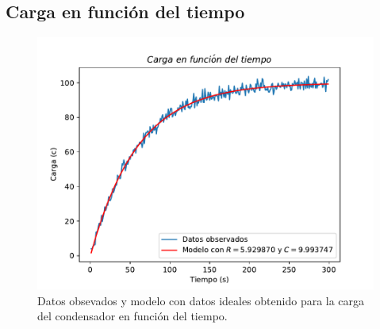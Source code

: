 \documentclass[12pt,letterpaper]{article}
\begin{document}
\subsection{Carga en función del tiempo}
\begin{figure}[H]
\includegraphics{carga.pdf}
\caption{Datos obsevados y modelo con datos ideales obtenido para la carga del condensador en función del tiempo.}
\centering
\end{figure}

\vspace{0.3cm}
\end{document}
